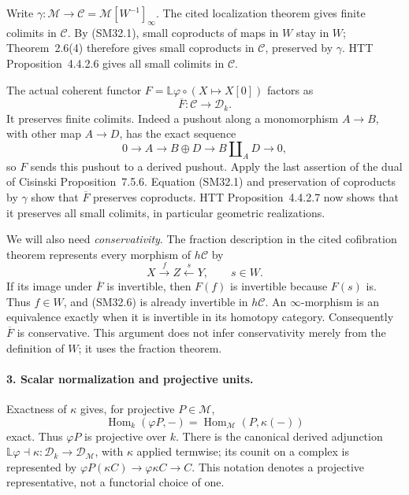 \documentclass[11pt,a4paper]{article}
\theoremstyle{definition}\newtheorem{definition}[theorem]{Definition}
\theoremstyle{remark}\newtheorem{remark}[theorem]{Remark}
\begin{document}
Write \(\gamma:\mathcal M\to\mathcal C=
\mathcal M[W^{-1}]_\infty\).  The cited localization theorem
gives finite colimits in \(\mathcal C\).  By (SM32.1), small
coproducts of maps in \(W\) stay in \(W\); Theorem~2.6(4)
therefore gives small coproducts in \(\mathcal C\), preserved
by \(\gamma\).  HTT Proposition~4.4.2.6 gives all small
colimits in \(\mathcal C\).

The actual coherent functor
\(F=\mathbb L\varphi\circ(X\mapsto X[0])\) factors as
\[
             \overline F:\mathcal C\longrightarrow\mathcal D_k.
                                                               \tag{SM32.5}
\]
It preserves finite colimits.  Indeed a pushout along a
monomorphism \(A\to B\), with other map \(A\to D\), has
the exact sequence
\[
 0\longrightarrow A\longrightarrow B\oplus D
                   \longrightarrow B\amalg_A D\longrightarrow0,
\]
so \(F\) sends this pushout to a derived pushout.  Apply the
last assertion of the dual of Cisinski Proposition~7.5.6.
Equation (SM32.1) and preservation of coproducts by
\(\gamma\) show that \(\overline F\) preserves coproducts.
HTT Proposition~4.4.2.7 now shows that it preserves all small
colimits, in particular geometric realizations.

We will also need \emph{conservativity}.  The fraction
description in the cited cofibration theorem represents every
morphism of \(h\mathcal C\) by
\[
                  X\xrightarrow{f}Z\xleftarrow{s}Y,
                       \qquad s\in W.                        \tag{SM32.6}
\]
If its image under \(\overline F\) is invertible, then
\(F(f)\) is invertible because \(F(s)\) is.  Thus
\(f\in W\), and (SM32.6) is already invertible in
\(h\mathcal C\).  An \(\infty\)-morphism is an equivalence
exactly when it is invertible in its homotopy category.
Consequently \(\overline F\) is conservative.  This argument
does not infer conservativity merely from the definition of
\(W\); it uses the fraction theorem.

\paragraph{3. Scalar normalization and projective units.}
Exactness of \(\kappa\) gives, for projective \(P\in\mathcal M\),
\[
 \operatorname{Hom}_k(\varphi P,-)
                  =\operatorname{Hom}_{\mathcal M}(P,\kappa(-))
\]
exact.  Thus \(\varphi P\) is projective over \(k\).
There is the canonical derived adjunction
\(\mathbb L\varphi\dashv\kappa:\mathcal D_k\to
\mathcal D_{\mathcal M}\), with \(\kappa\) applied termwise;
its counit on a complex is represented by
\(\varphi P(\kappa C)\to\varphi\kappa C\to C\).
This notation denotes a projective representative, not a
functorial choice of one.
\end{document}
